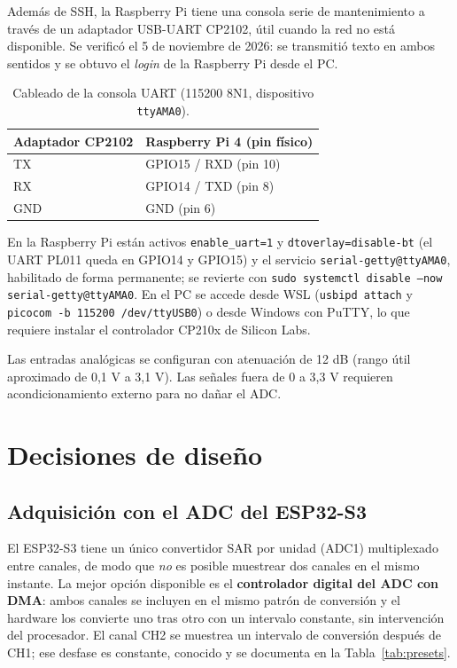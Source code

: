 \documentclass[12pt,a4paper]{article}
\begin{document}
Además de SSH, la Raspberry Pi tiene una consola serie de mantenimiento a través de un adaptador USB-UART CP2102, útil cuando la red no está disponible. Se verificó el 5 de noviembre de 2026: se transmitió texto en ambos sentidos y se obtuvo el \emph{login} de la Raspberry Pi desde el PC.

\begin{table}[H]
\centering
\small
\begin{tabular}{@{}p{3.6cm} p{6.0cm}@{}}
\toprule
\textbf{Adaptador CP2102} & \textbf{Raspberry Pi 4 (pin físico)} \\
\midrule
TX  & GPIO15 / RXD (pin 10) \\
RX  & GPIO14 / TXD (pin 8) \\
GND & GND (pin 6) \\
\bottomrule
\end{tabular}
\caption{Cableado de la consola UART (115200 8N1, dispositivo \texttt{ttyAMA0}).}
\end{table}

En la Raspberry Pi están activos \texttt{enable\_uart=1} y \texttt{dtoverlay=disable-bt} (el UART PL011 queda en GPIO14 y GPIO15) y el servicio \texttt{serial-getty@ttyAMA0}, habilitado de forma permanente; se revierte con \texttt{sudo systemctl disable --now serial-getty@ttyAMA0}. En el PC se accede desde WSL (\texttt{usbipd attach} y \texttt{picocom -b 115200 /dev/ttyUSB0}) o desde Windows con PuTTY, lo que requiere instalar el controlador CP210x de Silicon Labs.

Las entradas analógicas se configuran con atenuación de 12 dB (rango útil aproximado de 0{,}1 V a 3{,}1 V). Las señales fuera de 0 a 3{,}3 V requieren acondicionamiento externo para no dañar el ADC.

\section{Decisiones de diseño}

\subsection{Adquisición con el ADC del ESP32-S3}

El ESP32-S3 tiene un único convertidor SAR por unidad (ADC1) multiplexado entre canales, de modo que \emph{no} es posible muestrear dos canales en el mismo instante. La mejor opción disponible es el \textbf{controlador digital del ADC con DMA}: ambos canales se incluyen en el mismo patrón de conversión y el hardware los convierte uno tras otro con un intervalo constante, sin intervención del procesador. El canal CH2 se muestrea un intervalo de conversión después de CH1; ese desfase es constante, conocido y se documenta en la Tabla~\ref{tab:presets}.
\end{document}
